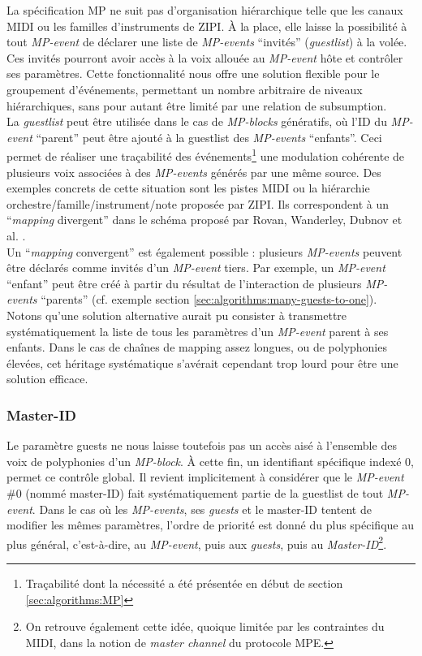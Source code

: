 \noindent La spécification MP ne suit pas d'organisation hiérarchique telle que les canaux \gls{MIDI} ou les familles d'instruments de \gls{ZIPI}. À la place, elle laisse la possibilité à tout \textit{MP-event} de déclarer une liste de \textit{MP-events} ``invités'' (\textit{guestlist}) à la volée. Ces invités pourront avoir accès à la voix allouée au \textit{MP-event} hôte et contrôler ses paramètres. Cette fonctionnalité nous offre une solution flexible pour le groupement d'événements, permettant un nombre arbitraire de niveaux hiérarchiques, sans pour autant être limité par une relation de subsumption.\\
\indent La \textit{guestlist} peut être utilisée dans le cas de \textit{MP-blocks} génératifs, où l'ID du \textit{MP-event} ``parent'' peut être ajouté à la guestlist des \textit{MP-events} ``enfants''. Ceci permet de réaliser une traçabilité des événements\footnote{Traçabilité dont la nécessité a été présentée en début de section \ref{sec:algorithms:MP}} une modulation cohérente de plusieurs voix associées à des \textit{MP-events} générés par une même source. Des exemples concrets de cette situation sont les pistes \gls{MIDI} ou la hiérarchie orchestre/famille/instrument/note proposée par \gls{ZIPI}. Ils correspondent à un ``\textit{\gls{mapping}} divergent'' dans le schéma proposé par Rovan, Wanderley, Dubnov et al. \cite{rovan_instrumental_1997}.\\
\indent Un ``\textit{\gls{mapping}} convergent'' est également possible : plusieurs \textit{MP-events} peuvent être déclarés comme invités d'un \textit{MP-event} tiers. Par exemple, un \textit{MP-event} ``enfant'' peut être créé à partir du résultat de l'interaction de plusieurs \textit{MP-events} ``parents'' (cf. exemple section \ref{sec:algorithms:many-guests-to-one}).\\
\indent Notons qu'une solution alternative aurait pu consister à transmettre systématiquement la liste de tous les paramètres d'un \textit{MP-event} parent à ses enfants. Dans le cas de chaînes de mapping assez longues, ou de polyphonies élevées, cet héritage systématique s'avérait cependant trop lourd pour être une solution efficace.


\subsubsection{Master-ID}

\noindent Le paramètre guests ne nous laisse toutefois pas un accès aisé à l'ensemble des voix de polyphonies d'un \textit{MP-block}. À cette fin, un identifiant spécifique indexé 0, permet ce contrôle global. Il revient implicitement à considérer que le \textit{MP-event} \#0 (nommé master-ID) fait systématiquement partie de la guestlist de tout \textit{MP-event}. Dans le cas où les \textit{MP-events}, ses \textit{guests} et le master-ID tentent de modifier les mêmes paramètres, l'ordre de priorité est donné du plus spécifique au plus général, c'est-à-dire, au \textit{MP-event}, puis aux \textit{guests}, puis au \textit{Master-ID}\footnote{On retrouve également cette idée, quoique limitée par les contraintes du \gls{MIDI}, dans la notion de \textit{master channel} du protocole \gls{MPE}.}.

